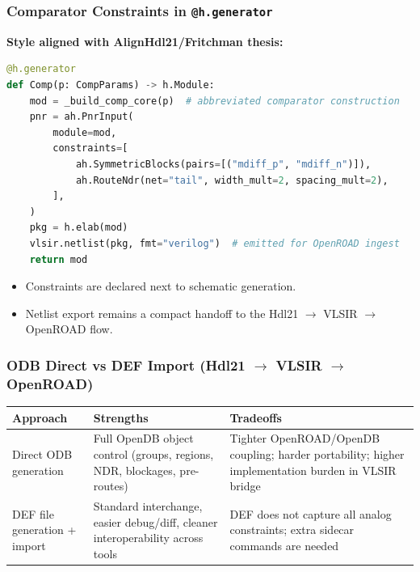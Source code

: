 \documentclass[aspectratio=169]{beamer}
\begin{document}
\begin{frame}[fragile]
  \frametitle{Comparator Constraints in \texttt{@h.generator}}
  \small
  \textbf{Style aligned with AlignHdl21/Fritchman thesis:}
  \begin{lstlisting}[language=Python,basicstyle=\ttfamily\scriptsize]
@h.generator
def Comp(p: CompParams) -> h.Module:
    mod = _build_comp_core(p)  # abbreviated comparator construction
    pnr = ah.PnrInput(
        module=mod,
        constraints=[
            ah.SymmetricBlocks(pairs=[("mdiff_p", "mdiff_n")]),
            ah.RouteNdr(net="tail", width_mult=2, spacing_mult=2),
        ],
    )
    pkg = h.elab(mod)
    vlsir.netlist(pkg, fmt="verilog")  # emitted for OpenROAD ingest
    return mod
  \end{lstlisting}
  \vspace{0.4em}
  \begin{itemize}
    \item Constraints are declared next to schematic generation.
    \item Netlist export remains a compact handoff to the Hdl21 $\rightarrow$ VLSIR $\rightarrow$ OpenROAD flow.
  \end{itemize}
\end{frame}

\begin{frame}
  \frametitle{ODB Direct vs DEF Import (Hdl21 $\rightarrow$ VLSIR $\rightarrow$ OpenROAD)}
  \small
  \begin{center}
    \begin{tabular}{p{2.7cm}|p{4.2cm}|p{4.9cm}}
      \hline
      \textbf{Approach} & \textbf{Strengths} & \textbf{Tradeoffs} \\
      \hline
      Direct ODB generation &
      Full OpenDB object control (groups, regions, NDR, blockages, pre-routes) &
      Tighter OpenROAD/OpenDB coupling; harder portability; higher implementation burden in VLSIR bridge \\
      \hline
      DEF file generation + import &
      Standard interchange, easier debug/diff, cleaner interoperability across tools &
      DEF does not capture all analog constraints; extra sidecar commands are needed \\
      \hline
    \end{tabular}
  \end{center}
  \vspace{0.5em}
\end{frame}
\end{document}
